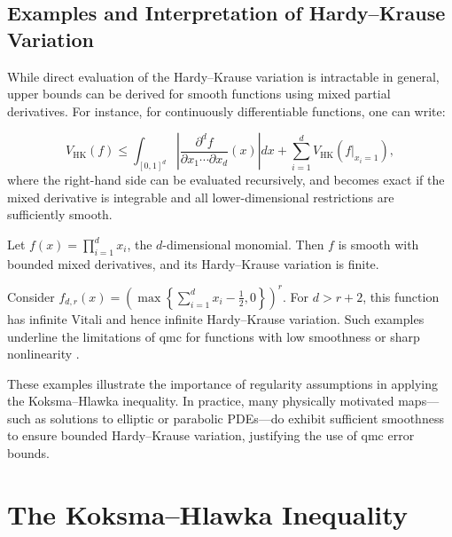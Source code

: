 \subsection{Examples and Interpretation of Hardy--Krause Variation}
\label{sec:hk-examples}

While direct evaluation of the Hardy--Krause variation is intractable in general, upper bounds can be derived for smooth functions using mixed partial derivatives. For instance, for continuously differentiable functions, one can write:

\begin{equation*}
    V_{\mathrm{HK}}(f) \leq \int_{[0,1]^d} \left| \frac{\partial^d f}{\partial x_1 \cdots \partial x_d}(x) \right| dx + \sum_{i=1}^d V_{\mathrm{HK}}(f|_{x_i = 1}),
\end{equation*}
where the right-hand side can be evaluated recursively, and becomes exact if the mixed derivative is integrable and all lower-dimensional restrictions are sufficiently smooth.

\begin{example}
Let $f(x) = \prod_{i=1}^d x_i$, the $d$-dimensional monomial. Then $f$ is smooth with bounded mixed derivatives, and its Hardy--Krause variation is finite.
\end{example}

\begin{example}
Consider $f_{d,r}(x) = \left( \max\left\{ \sum_{i=1}^d x_i - \frac{1}{2}, 0
\right\} \right)^r$. For $d > r + 2$, this function has infinite Vitali and
hence infinite Hardy--Krause variation. Such examples underline the limitations
of \ac{qmc} for functions with low smoothness or sharp nonlinearity
\cite{owen2005multidimensional}.
\end{example}

These examples illustrate the importance of regularity assumptions in applying
the Koksma--Hlawka inequality. In practice, many physically motivated maps—such
as solutions to elliptic or parabolic PDEs—do exhibit sufficient smoothness to
ensure bounded Hardy--Krause variation, justifying the use of \ac{qmc} error
bounds.

\section{The Koksma--Hlawka Inequality}

